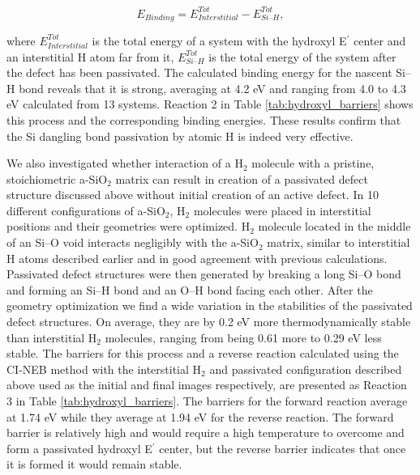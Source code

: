 \documentclass[aps,prb,reprint,superscriptaddress,showpacs]{revtex4-1}
\begin{document}
\begin{equation}
E_{Binding}=E^{Tot}_{Interstitial}-E^{Tot}_{Si\text{--}H},
\label{eq:binding}
\end{equation}

where $E^{Tot}_{Interstitial}$ is the total energy of a system with the hydroxyl E$^\prime$ center and an interstitial H atom far from it, $E^{Tot}_{Si\text{--}H}$ is the total energy of the system after the defect has been passivated. The calculated binding energy for the nascent \mbox{Si--H} bond reveals that it is strong, averaging at 4.2 eV and ranging from 4.0 to 4.3 eV calculated from 13 systems. Reaction 2 in Table \ref{tab:hydroxyl_barriers} shows this process and the corresponding binding energies. These results confirm that the Si dangling bond passivation by atomic H is indeed very effective. 

We also investigated whether interaction of a H$_2$ molecule with a pristine, stoichiometric a-SiO$_2$ matrix can result in creation of a passivated defect structure discussed above without initial creation of an active defect. In 10 different configurations of a-SiO$_2$, H$_2$ molecules were placed in interstitial positions and their geometries were optimized. H$_2$ molecule located in the middle of an \mbox{Si--O} void interacts negligibly with the a-SiO$_2$ matrix, similar to interstitial H atoms described earlier and in good agreement with previous calculations.~\cite{BUNSON99,blochl_vacancies} Passivated defect structures were then generated by breaking a long \mbox{Si--O} bond and forming an \mbox{Si--H} bond and an \mbox{O--H} bond facing each other. After the geometry optimization we find a wide variation in the stabilities of the passivated defect structures. On average, they are by 0.2 eV more thermodynamically stable than interstitial H$_2$ molecules, ranging from being 0.61 more to 0.29 eV less stable. The barriers for this process and a reverse reaction calculated using the CI-NEB method with the interstitial H$_2$ and passivated configuration described above used as the initial and final images respectively, are presented as Reaction 3 in Table \ref{tab:hydroxyl_barriers}. The barriers for the forward reaction average at 1.74 eV while they average at 1.94 eV for the reverse reaction. The forward barrier is relatively high and would require a high temperature to overcome and form a passivated hydroxyl E$^\prime$ center, but the reverse barrier indicates that once it is formed it would remain stable.
\end{document}
